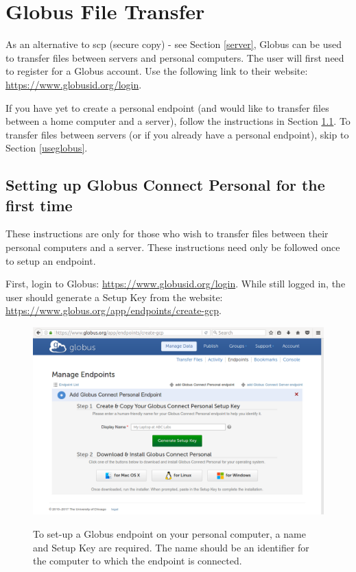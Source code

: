 \documentclass[12pt]{article}
\begin{document}
\section{Globus File Transfer}

\quad As an alternative to scp (secure copy) - see Section \ref{server}, Globus can be used to transfer files between servers and personal computers. The user will first need to register for a Globus account. Use the following link to their website: \url{https://www.globusid.org/login}.

\quad If you have yet to create a personal endpoint (and would like to transfer files between a home computer and a server), follow the instructions in Section \ref{globus-setup}. To transfer files between servers (or if you already have a personal endpoint), skip to Section \ref{useglobus}.

\subsection{Setting up Globus Connect Personal for the first time}\label{globus-setup}

\quad These instructions are only for those who wish to transfer files between their personal computers and a server. These instructions need only be followed once to setup an endpoint. 

\quad First, login to Globus: \url{https://www.globusid.org/login}. While still logged in, the user should generate a Setup Key from the website: \url{https://www.globus.org/app/endpoints/create-gcp}.

\begin{figure}[H]
\centering
\caption{To set-up a Globus endpoint on your personal computer, a name and Setup Key are required. The name should be an identifier for the computer to which the endpoint is connected.}
\includegraphics[width=\textwidth]{globus-1}
\label{globus-1}
\end{figure}
\end{document}

